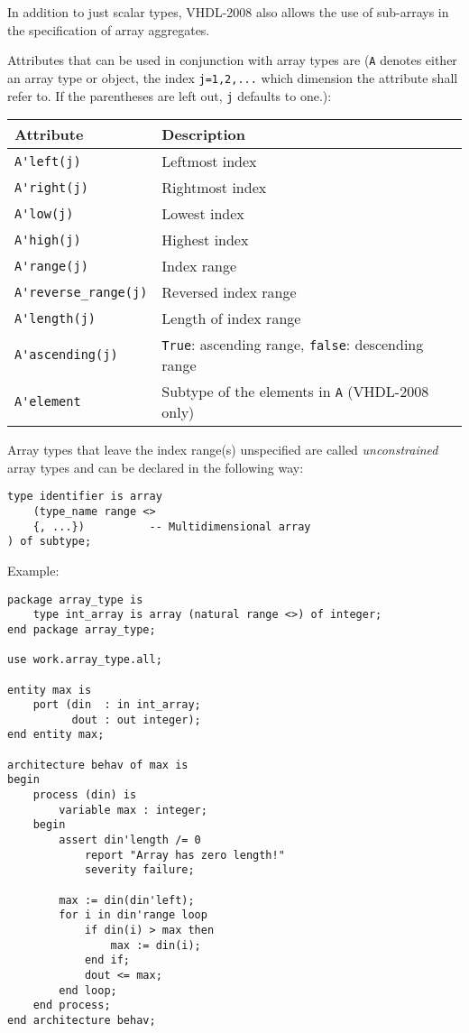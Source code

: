\documentclass[fontsize=11pt,a4paper]{scrartcl}
\begin{document}
In addition to just scalar types, VHDL-2008 also allows the use of sub-arrays in the specification of array aggregates.

Attributes that can be used in conjunction with array types are (\lstinline!A! denotes either an array type or object, the index \lstinline!j=1,2,...! which dimension the attribute shall refer to. If the parentheses are left out, \lstinline!j! defaults to one.):

\begin{tabular}{ll}
\toprule
	\textbf{Attribute} & \textbf{Description}\\
\midrule
	\lstinline!A'left(j)! & Leftmost index\\
	\lstinline!A'right(j)! & Rightmost index\\
	\lstinline!A'low(j)! & Lowest index\\
	\lstinline!A'high(j)! & Highest index\\
	\lstinline!A'range(j)! & Index range\\
	\lstinline!A'reverse_range(j)! & Reversed index range\\
	\lstinline!A'length(j)! & Length of index range\\
	\lstinline!A'ascending(j)! & \lstinline!True!: ascending range, \lstinline!false!: descending range\\
	\lstinline!A'element! & Subtype of the elements in \lstinline!A! (VHDL-2008 only)\\
\bottomrule
\end{tabular}

Array types that leave the index range(s) unspecified are called \emph{unconstrained} array types and can be declared in the following way:
\begin{lstlisting}
type identifier is array
	(type_name range <>
	{, ...})          -- Multidimensional array
) of subtype;
\end{lstlisting}

Example:
\begin{lstlisting}
package array_type is
	type int_array is array (natural range <>) of integer;
end package array_type;

use work.array_type.all;

entity max is
	port (din  : in int_array;
	      dout : out integer);
end entity max;

architecture behav of max is
begin
	process (din) is
		variable max : integer;
	begin
		assert din'length /= 0
			report "Array has zero length!"
			severity failure;

		max := din(din'left);
		for i in din'range loop
			if din(i) > max then
				max := din(i);
			end if;
			dout <= max;
		end loop;
	end process;
end architecture behav;
\end{lstlisting}
\end{document}

